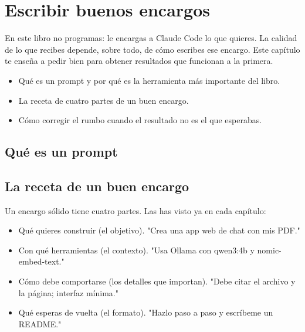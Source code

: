 \documentclass[11pt,a4paper]{book}
\begin{document}
\chapter{Escribir buenos encargos}
En este libro no programas: le encargas a Claude Code lo que quieres. La calidad de lo que recibes depende, sobre todo, de cómo escribes ese encargo. Este capítulo te enseña a pedir bien para obtener resultados que funcionan a la primera.

\begin{itemize}\item Qué es un prompt y por qué es la herramienta más importante del libro.\end{itemize}
\begin{itemize}\item La receta de cuatro partes de un buen encargo.\end{itemize}
\begin{itemize}\item Cómo corregir el rumbo cuando el resultado no es el que esperabas.\end{itemize}
\section{Qué es un prompt}
\section{La receta de un buen encargo}
Un encargo sólido tiene cuatro partes. Las has visto ya en cada capítulo:

\begin{itemize}\item Qué quieres construir (el objetivo). "Crea una app web de chat con mis PDF."\end{itemize}
\begin{itemize}\item Con qué herramientas (el contexto). "Usa Ollama con qwen3:4b y nomic-embed-text."\end{itemize}
\begin{itemize}\item Cómo debe comportarse (los detalles que importan). "Debe citar el archivo y la página; interfaz mínima."\end{itemize}
\begin{itemize}\item Qué esperas de vuelta (el formato). "Hazlo paso a paso y escríbeme un README."\end{itemize}
\end{document}
